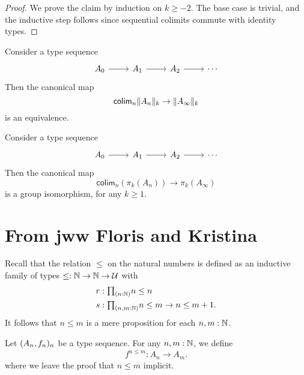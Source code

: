\begin{proof}
We prove the claim by induction on $k\geq -2$. The base case is trivial, and the inductive step follows since sequential colimits commute with identity types.
\end{proof}

\begin{thm}
Consider a type sequence
\begin{equation*}
\begin{tikzcd}
A_0 \arrow[r] & A_1 \arrow[r] & A_2 \arrow[r] & \cdots
\end{tikzcd}
\end{equation*}
Then the canonical map
\begin{equation*}
\mathsf{colim}_n \trunc{k}{A_n} \to \trunc{k}{A_\infty}
\end{equation*}
is an equivalence. 
\end{thm}

\begin{thm}\label{thm:colim_hgroup}
Consider a type sequence
\begin{equation*}
\begin{tikzcd}
A_0 \arrow[r] & A_1 \arrow[r] & A_2 \arrow[r] & \cdots
\end{tikzcd}
\end{equation*}
Then the canonical map
\begin{equation*}
\mathsf{colim}_n(\pi_k(A_n))\to \pi_k(A_\infty)
\end{equation*}
is a group isomorphism, for any $k\geq 1$.
\end{thm}

\section{From jww Floris and Kristina}
Recall that the relation $\leq$ on the natural numbers is defined as an inductive family of types $\leq:\N\to\N\to\UU$ with
\begin{align*}
r & : \prd{n:\N} n\leq n \\
s & : \prd{n,m:\N} n\leq m \to n\leq m+1.
\end{align*}
It follows that $n\leq m$ is a mere proposition for each $n,m:\N$.

\begin{defn}
Let $\sequence{A}{f}$ be a type sequence. For any $n,m:\nat$, we define
\begin{equation*}
f^{n\leq m} : A_n\to A_m.
\end{equation*}
where we leave the proof that $n\leq m$ implicit.
\end{defn}

